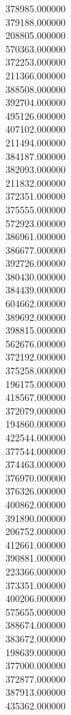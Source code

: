 378985.000000\\
379188.000000\\
208805.000000\\
570363.000000\\
372253.000000\\
211366.000000\\
388508.000000\\
392704.000000\\
495126.000000\\
407102.000000\\
211494.000000\\
384187.000000\\
382093.000000\\
211832.000000\\
372351.000000\\
375555.000000\\
572923.000000\\
386961.000000\\
386677.000000\\
392726.000000\\
380430.000000\\
384439.000000\\
604662.000000\\
389692.000000\\
398815.000000\\
562676.000000\\
372192.000000\\
375258.000000\\
196175.000000\\
418567.000000\\
372079.000000\\
194860.000000\\
422544.000000\\
377544.000000\\
374463.000000\\
376970.000000\\
376326.000000\\
400862.000000\\
391890.000000\\
206752.000000\\
412661.000000\\
390881.000000\\
223366.000000\\
373351.000000\\
400206.000000\\
575655.000000\\
388674.000000\\
383672.000000\\
198639.000000\\
377000.000000\\
372877.000000\\
387913.000000\\
435362.000000\\
